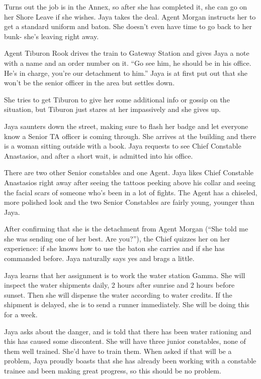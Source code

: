 Turns out the job is in the Annex, so after she has completed it, she can go on her Shore Leave if she wishes.  Jaya takes the deal.  Agent Morgan instructs her to get a standard uniform and baton.  She doesn't even have time to go back to her bunk- she's leaving right away.



Agent Tiburon Rook drives the train to Gateway Station and gives Jaya a note with a name and an order number on it. ``Go see him, he should be in his office.  He's in charge, you're our detachment to him.''  Jaya is at first put out that she won't be the senior officer in the area but settles down.



She tries to get Tiburon to give her some additional info or gossip on the situation, but Tiburon just stares at her impassively and she gives up.



Jaya saunters down the street, making sure to flash her badge and let everyone know a Senior TA officer is coming through.  She arrives at the building and there is a woman sitting outside with a book.  Jaya requests to see Chief Constable Anastasios, and after a short wait, is admitted into his office.  



There are two other Senior constables and one Agent.  Jaya likes Chief Constable Anastasios right away after seeing the tattoos peeking above his collar and seeing the facial scars of someone who's been in a lot of fights.  The Agent has a chiseled, more polished look and the two Senior Constables are fairly young, younger than Jaya.



After confirming that she is the detachment from Agent Morgan (``She told me she was sending one of her best.  Are you?''), the Chief quizzes her on her experience: if she knows how to use the baton she carries and if she has commanded before.  Jaya naturally says yes and brags a little.



Jaya learns that her assignment is to work the water station Gamma.  She will inspect the water shipments daily, 2 hours after sunrise and 2 hours before sunset.  Then she will dispense the water according to water credits.  If the shipment is delayed, she is to send a runner immediately.  She will be doing this for a week.



Jaya asks about the danger, and is told that there has been water rationing and this has caused some discontent.  She will have three junior constables, none of them well trained.  She'd have to train them.  When asked if that will be a problem, Jaya proudly boasts that she has already been working with a constable trainee and been making great progress, so this should be no problem.



